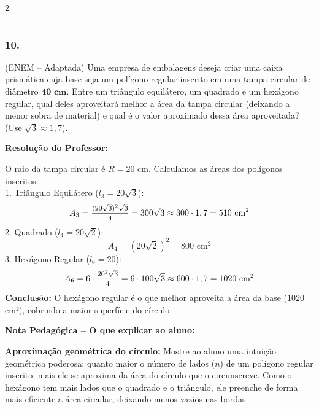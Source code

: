 \begin{multicols*}{2}
\par\vspace{\espacoQuestao}

\noindent\textcolor{CorLinha}{\rule{\linewidth}{0.5pt}} 
\par\vspace{\espacoPreQuestao}

\subsubsection*{10.} (ENEM -- Adaptada) Uma empresa de embalagens deseja criar uma caixa prismática cuja base seja um polígono regular inscrito em uma tampa circular de diâmetro $\mathbf{40\text{ cm}}$. Entre um triângulo equilátero, um quadrado e um hexágono regular, qual deles aproveitará melhor a área da tampa circular (deixando a menor sobra de material) e qual é o valor aproximado dessa área aproveitada? (Use $\sqrt{3} \approx 1,7$).

\ifgabarito
    \begin{tcolorbox}[colback=CorTitUm!5, colframe=CorTitUm, boxrule=1pt, arc=4pt, left=6pt, right=6pt, top=6pt, bottom=6pt]
    \small\textbf{\textcolor{CorTitUm}{Resolução do Professor:}}\par\vspace{0.1cm}
    \color{CinzaEscuro}
    O raio da tampa circular é $R = 20$ cm. Calculamos as áreas dos polígonos inscritos:
    \\[0.1cm]
    1. Triângulo Equilátero ($l_3 = 20\sqrt{3}$): 
    \[ A_3 = \mfrac{(20\sqrt{3})^2\sqrt{3}}{4} = 300\sqrt{3} \approx 300 \cdot 1,7 = 510 \text{ cm}^2 \]
    2. Quadrado ($l_4 = 20\sqrt{2}$): 
    \[ A_4 = (20\sqrt{2})^2 = 800 \text{ cm}^2 \]
    3. Hexágono Regular ($l_6 = 20$): 
    \[ A_6 = 6 \cdot \mfrac{20^2\sqrt{3}}{4} = 6 \cdot 100\sqrt{3} \approx 600 \cdot 1,7 = 1020 \text{ cm}^2 \]
    \textbf{Conclusão:} O hexágono regular é o que melhor aproveita a área da base ($1020$ cm²), cobrindo a maior superfície do círculo.
    \end{tcolorbox}
    
    \begin{boxpedagogica}
    \textbf{\textcolor{CorVerdeBorda}{Nota Pedagógica -- O que explicar ao aluno:}}\par\vspace{0.1cm}
    \color{CinzaEscuro}
    \textbf{Aproximação geométrica do círculo:} Mostre ao aluno uma intuição geométrica poderosa: quanto maior o número de lados ($n$) de um polígono regular inscrito, mais ele se aproxima da área do círculo que o circunscreve. Como o hexágono tem mais lados que o quadrado e o triângulo, ele preenche de forma mais eficiente a área circular, deixando menos vazios nas bordas.
    \end{boxpedagogica}
\fi

\end{multicols*}
